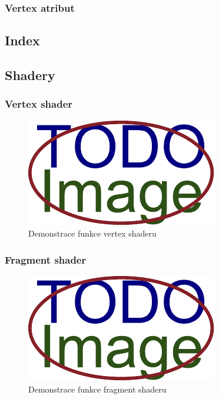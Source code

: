 
\subsubsection*{Vertex atribut}\label{ch:teorie:opengl:vertex:attr}

\subsection{Index}\label{ch:teorie:opengl:index}

\subsection{Shadery}\label{ch:teorie:opengl:shadery}

\subsubsection*{Vertex shader}\label{ch:teorie:opengl:vertex-shader}

\begin{figure}[H]
	\centering
	\includegraphics[width=.5\linewidth]{obrazky-figures/placeholder.pdf}
	\caption{Demonstrace funkce vertex shaderu}
	\label{fig:opengl:vertex-shader}
\end{figure}

\subsubsection*{Fragment shader}\label{ch:teorie:opengl:fragment-shader}

\begin{figure}[H]
	\centering
	\includegraphics[width=.5\linewidth]{obrazky-figures/placeholder.pdf}
	\caption{Demonstrace funkce fragment shaderu}
	\label{fig:opengl:vertex-shader}
\end{figure}


